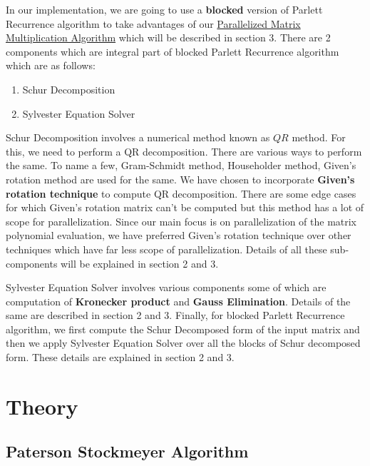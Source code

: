 \documentclass[12pt,a4paper]{article}
\begin{document}
\newpage
In our implementation, we are going to use a \textbf{blocked} version of Parlett Recurrence algorithm to take advantages of our \underline{Parallelized Matrix Multiplication Algorithm} which will be described in section 3. There are 2 components which are integral part of blocked Parlett Recurrence algorithm which are as follows:
\begin{enumerate}
    \item Schur Decomposition
    \item Sylvester Equation Solver
\end{enumerate}

Schur Decomposition involves a numerical method known as \underline{$QR$} method. For this, we need to perform a QR decomposition. There are various ways to perform the same. To name a few, Gram-Schmidt method, Householder method, Given's rotation method are used for the same. We have chosen to incorporate \textbf{Given's rotation technique} to compute QR decomposition. There are some edge cases for which Given's rotation matrix can't be computed but this method has a lot of scope for parallelization. Since our main focus is on parallelization of the matrix polynomial evaluation, we have preferred Given's rotation technique over other techniques which have far less scope of parallelization. Details of all these sub-components will be explained in section 2 and 3.

Sylvester Equation Solver involves various components some of which are computation of \textbf{Kronecker product} and \textbf{Gauss Elimination}. Details of the same are described in section 2 and 3. Finally, for blocked Parlett Recurrence algorithm, we first compute the Schur Decomposed form of the input matrix and then we apply Sylvester Equation Solver over all the blocks of Schur decomposed form. These details are explained in section 2 and 3.

\newpage
\section{Theory}\label{sec:lit-rev}

\subsection{Paterson Stockmeyer Algorithm}
\end{document}
